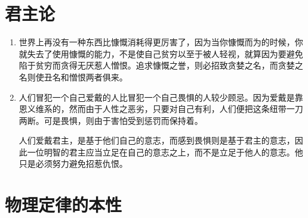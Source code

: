 \documentclass[UTF8]{ctexart}
\begin{document}
	\newpage
	
	\section{君主论}
	
	
		\begin{enumerate}
			
			\item 世界上再没有一种东西比慷慨消耗得更厉害了，因为当你慷慨而为的时候，你就失去了使用慷慨的能力，不是使自己贫穷以至于被人轻视，就算因为要避免陷于贫穷而贪得无厌惹人憎恨。追求慷慨之誉，则必招致贪婪之名，而贪婪之名则使丑名和憎恨两者俱来。
			
			\item 人们冒犯一个自己爱戴的人比冒犯一个自己畏惧的人较少顾忌。因为爱戴是靠恩义维系的，然而由于人性之恶劣，只要对自己有利，人们便把这条纽带一刀两断。可是畏惧，则由于害怕受到惩罚而保持着。
			
			人们爱戴君主，是基于他们自己的意志，而感到畏惧则是基于君主的意志，因此一位明智的君主应当立足在自己的意志之上，而不是立足于他人的意志。他只是必须努力避免招惹仇恨。
			
			
				
		\end{enumerate}
		
	\newpage
	
	\section{物理定律的本性}
	
		
\end{document}
